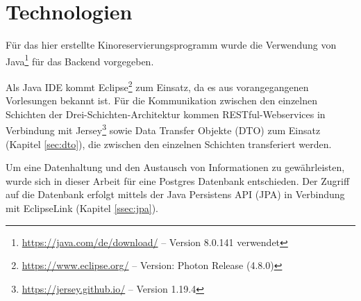 \section{Technologien}
\label{sec:technologien}
Für das hier erstellte Kinoreservierungsprogramm wurde die Verwendung von Java\footnote{\url{https://java.com/de/download/} -- Version 8.0.141 verwendet} für das Backend vorgegeben. 

Als Java IDE kommt Eclipse\footnote{\url{https://www.eclipse.org/} -- Version: Photon Release (4.8.0)} zum Einsatz, da es aus vorangegangenen Vorlesungen bekannt ist. Für die Kommunikation zwischen den einzelnen Schichten der Drei-Schichten-Architektur kommen RESTful-Webservices in Verbindung mit Jersey\footnote{\url{https://jersey.github.io/} -- Version 1.19.4} sowie Data Transfer Objekte (DTO) zum Einsatz (Kapitel \vref{sec:dto}), die zwischen den einzelnen Schichten transferiert werden. 

Um eine Datenhaltung und den Austausch von Informationen zu gewährleisten, wurde sich in dieser Arbeit für eine Postgres Datenbank entschieden. Der Zugriff auf die Datenbank erfolgt mittels der Java Persistens API (JPA) in Verbindung mit EclipseLink (Kapitel \vref{ssec:jpa}).  